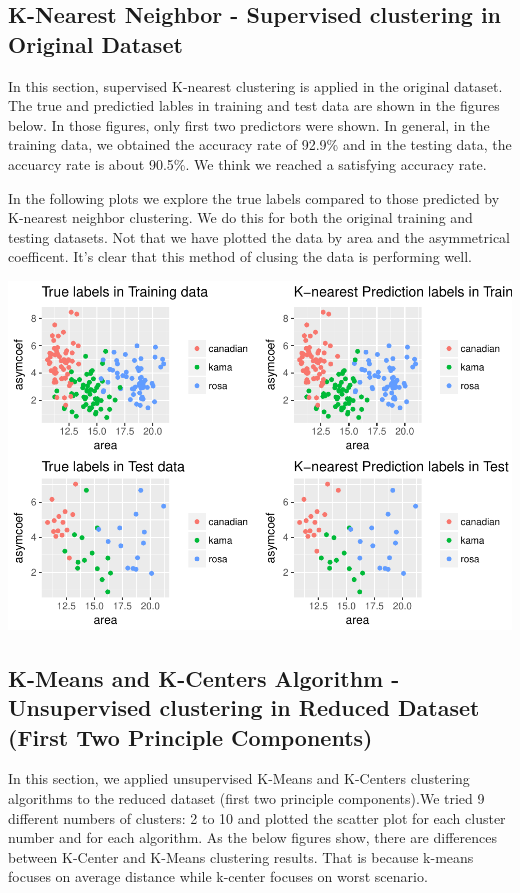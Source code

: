 \documentclass[]{article}
\begin{document}
\subsection{K-Nearest Neighbor - Supervised clustering in Original
Dataset}\label{k-nearest-neighbor---supervised-clustering-in-original-dataset}

In this section, supervised K-nearest clustering is applied in the
original dataset. The true and predictied lables in training and test
data are shown in the figures below. In those figures, only first two
predictors were shown. In general, in the training data, we obtained the
accuracy rate of 92.9\% and in the testing data, the accuarcy rate is
about 90.5\%. We think we reached a satisfying accuracy rate.

In the following plots we explore the true labels compared to those
predicted by K-nearest neighbor clustering. We do this for both the
original training and testing datasets. Not that we have plotted the
data by area and the asymmetrical coefficent. It's clear that this
method of clusing the data is performing well.

\includegraphics{Project2_files/figure-latex/- Fei-1.pdf}

\subsection{K-Means and K-Centers Algorithm - Unsupervised clustering in
Reduced Dataset (First Two Principle
Components)}\label{k-means-and-k-centers-algorithm---unsupervised-clustering-in-reduced-dataset-first-two-principle-components}

In this section, we applied unsupervised K-Means and K-Centers
clustering algorithms to the reduced dataset (first two principle
components).We tried 9 different numbers of clusters: 2 to 10 and
plotted the scatter plot for each cluster number and for each algorithm.
As the below figures show, there are differences between K-Center and
K-Means clustering results. That is because k-means focuses on average
distance while k-center focuses on worst scenario.
\end{document}
